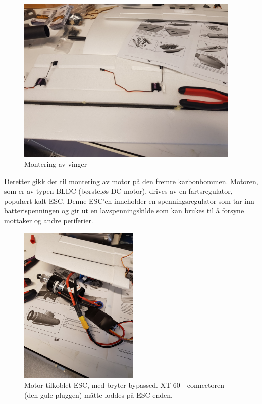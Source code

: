 \documentclass[12pt, a4paper]{article}
\begin{document}
\begin{figure}[ht]
	\centering
	\includegraphics[width=.6\textwidth,  height = 8cm]{bilder/vingemontering.jpg}
	\caption{Montering av vinger}
\end{figure}

\newpage
Deretter gikk det til montering av motor på den fremre karbonbommen. Motoren, som er av typen BLDC (børsteløs DC-motor), drives av en fartsregulator, populært kalt ESC. Denne ESC'en inneholder en spenningsregulator som tar inn batterispenningen og gir ut en lavspenningskilde som kan brukes til å forsyne mottaker og andre periferier. 

\begin{figure}[ht]
	\centering
	\includegraphics[height=7.6cm, width = .55\textwidth]{bilder/esc_og_motor.jpg}
	\caption[Observer-motor]{Motor tilkoblet ESC, med bryter bypassed. XT-60 - connectoren (den gule pluggen) måtte loddes på ESC-enden.}
\end{figure}
\end{document}
